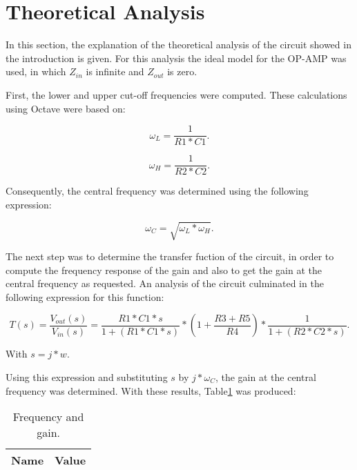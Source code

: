 \section{Theoretical Analysis}
\label{sec:analysis}

\par In this section, the explanation of the theoretical analysis of the circuit showed in the introduction is given. For this analysis the ideal model for the OP-AMP was used, in which $Z_{in}$ is infinite and $Z_{out}$ is zero.

\par First, the lower and upper cut-off frequencies were computed. These calculations using Octave were based on:

\begin{equation}
  \omega_{L} = \frac {1}{R1*C1}.
  \label{eq:eq1}
\end{equation}

\begin{equation}
  \omega_{H} = \frac {1}{R2*C2}.
  \label{eq:eq2}
\end{equation}

\par Consequently, the central frequency was determined using the following expression:

\begin{equation}
  \omega_{C} = \sqrt{\omega_{L}*\omega_{H}}.
  \label{eq:eq3}
\end{equation}

\par The next step was to determine the transfer fuction of the circuit, in order to compute the frequency response of the gain and also to get the gain at the central frequency as requested. An analysis of the circuit culminated in the following expression for this function:

\begin{equation}
  T(s) = \frac{V_{out}(s)}{V_{in}(s)} = \frac{R1*C1*s}{1 + (R1*C1*s)}*(1+\frac{R3 + R5}{R4})*\frac{1}{1 + (R2*C2*s)}.
  \label{eq:eq3}
\end{equation}

\par With $s=j*w$.

\par Using this expression and substituting $s$ by $j*\omega_{C}$, the gain at the central frequency was determined. With these results, Table\ref{tab:tr1} was produced:

\begin{table}[h]
  \centering
  \begin{tabular}{|l|r|}
    \hline    
    {\bf Name} & {\bf Value}\\ \hline
    
  \end{tabular}
  \caption{Frequency and gain.}
  \label{tab:tr1}
\end{table}

